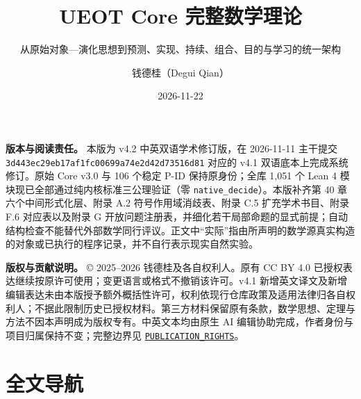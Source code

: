 \documentclass[
  11pt,
  oneside]{book}
\title{UEOT Core 完整数学理论}
\subtitle{从原始对象---演化思想到预测、实现、持续、组合、目的与学习的统一架构}
\author{钱德桂（Degui Qian）}
\date{2026-11-22}
\begin{document}
\frontmatter
\maketitle

{
\hypersetup{linkcolor=MidnightBlue}
\setcounter{tocdepth}{1}
\tableofcontents
}
\mainmatter
\textbf{版本与阅读责任。} 本版为 v4.2 中英双语学术修订版，在 2026-11-11 主干提交 \nolinkurl{3d443ec29eb17af1fc00699a74e2d42d73516d81} 对应的 v4.1 双语底本上完成系统修订。原始 Core v3.0 与 106 个稳定 P-ID 保持原身份；全库 1,051 个 Lean 4 模块现已全部通过纯内核标准三公理验证（零 \nolinkurl{native_decide}）。本版补齐第 40 章六个中间形式化层、附录 A.2 符号作用域消歧表、附录 C.5 扩充学术书目、附录 F.6 对应表以及附录 G 开放问题注册表，并细化若干局部命题的显式前提；自动结构检查不能替代外部数学同行评议。正文中``实际''指由所声明的数学源真实构造的对象或已执行的程序记录，并不自行表示现实自然实验。

\textbf{版权与贡献说明。} © 2025--2026 钱德桂及各自权利人。原有 CC BY 4.0 已授权表达继续按原许可使用；变更语言或格式不撤销该许可。v4.1 新增英文译文及新增编辑表达未由本版授予额外概括性许可，权利依现行仓库政策及适用法律归各自权利人；不据此限制历史已授权材料。第三方材料保留原有条款，数学思想、定理与方法不因本声明成为版权专有。中英文本均由原生 AI 编辑协助完成，作者身份与项目归属保持不变；完整边界见 \href{PUBLICATION_RIGHTS.md}{\nolinkurl{PUBLICATION_RIGHTS}}。

\section{全文导航}\label{ux5168ux6587ux5bfcux822a}
\end{document}
